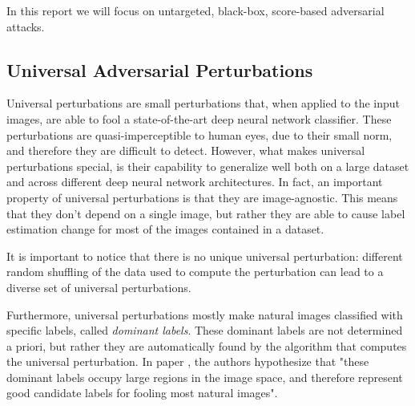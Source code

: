 


In this report we will focus on untargeted, black-box, score-based adversarial attacks.

\subsection{Universal Adversarial Perturbations}
Universal perturbations are small perturbations that, when applied to the input images, are able
to fool a state-of-the-art deep neural network classifier. These perturbations are quasi-imperceptible to human eyes,
due to their small norm, and therefore they are difficult to detect. However, what makes universal perturbations special,
is their capability to generalize well both on a large dataset and across different deep neural network architectures.
In fact, an important property of universal perturbations is that they are image-agnostic. This means that
they don't depend on a single image, but rather they are able to cause label estimation change for most of
the images contained in a dataset.

It is important to notice that there is no unique universal perturbation: different random shuffling of the data used
to compute the perturbation can lead to a diverse set of universal perturbations.

Furthermore, universal perturbations mostly make natural images classified with specific labels, called
\textit{dominant labels}. These dominant labels are not determined a priori, but rather they are automatically
found by the algorithm that computes the universal perturbation. In paper \cite{A2}, the authors
hypothesize that "these dominant labels occupy large regions in the image space, and therefore represent good
candidate labels for fooling most natural images".

